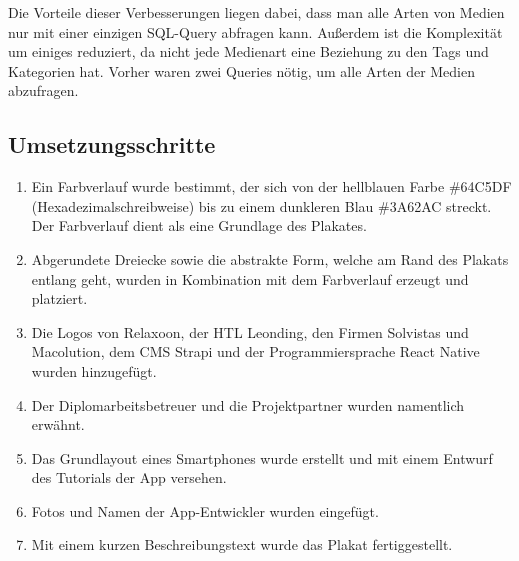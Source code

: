 \begin{spacing}{1}
    Die Vorteile dieser Verbesserungen liegen dabei, dass man alle Arten von Medien nur mit einer einzigen SQL-Query abfragen kann. Außerdem ist die Komplexität um einiges reduziert, da nicht jede Medienart eine Beziehung zu den Tags und Kategorien hat.
    Vorher waren zwei Queries nötig, um alle Arten der Medien abzufragen.

    \subsection{Umsetzungsschritte}

    \begin{enumerate}
        \item Ein Farbverlauf wurde bestimmt, der sich von der hellblauen Farbe \#64C5DF (Hexadezimalschreibweise)
              bis zu einem dunkleren Blau \#3A62AC streckt. Der Farbverlauf dient als eine Grundlage des Plakates.
        \item Abgerundete Dreiecke sowie die abstrakte Form, welche am Rand des Plakats entlang geht,
              wurden in Kombination mit dem Farbverlauf erzeugt und platziert.
        \item Die Logos von Relaxoon, der HTL Leonding, den Firmen Solvistas und Macolution, dem CMS Strapi und der Programmiersprache React Native wurden hinzugefügt.
        \item Der Diplomarbeitsbetreuer und die Projektpartner wurden namentlich erwähnt.
        \item Das Grundlayout eines Smartphones wurde erstellt und mit einem Entwurf des Tutorials der App versehen.
        \item Fotos und Namen der App-Entwickler wurden eingefügt.
        \item Mit einem kurzen Beschreibungstext wurde das Plakat fertiggestellt.
    \end{enumerate}



\end{spacing}
